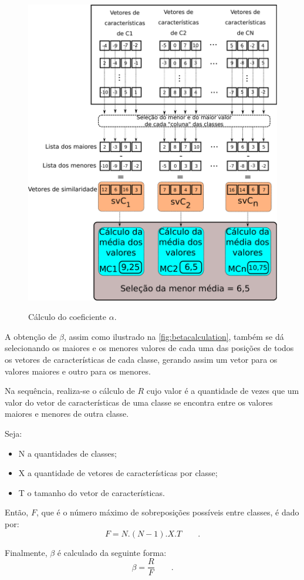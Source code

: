 			\begin{figure}[h]
				\centering
				\caption{Cálculo do coeficiente $\alpha$.}
				\includegraphics[width=0.5\linewidth]{images/calculoAlpha.pdf}
				\label{fig:calculoalpha}
			\end{figure}
			
			\par A obtenção de $\beta$, assim como ilustrado na  \autoref{fig:betacalculation}, também se dá selecionando os maiores e os menores valores de cada uma das posições de todos os vetores de características de cada classe, gerando assim um vetor para os valores maiores e outro para os menores.
			
			\par Na sequência, realiza-se o cálculo de $R$ cujo valor é a quantidade de vezes que um valor do vetor de características de uma classe se encontra entre os valores maiores e menores de outra classe.
			
			\par Seja:
			\begin{itemize}
				\item N a quantidades de classes;
				\item X a quantidade de vetores de características por classe;
				\item T o tamanho do vetor de características.
			\end{itemize}
			
			\par Então, $F$, que é o número máximo de sobreposições possíveis entre classes, é dado por:
			\begin{equation}
				F=N.(N-1).X.T \qquad.
			\end{equation}
			\par Finalmente, $\beta$ é calculado da seguinte forma:
			\begin{equation}
				\beta=\dfrac{R}{F} \qquad.
			\end{equation}
	
